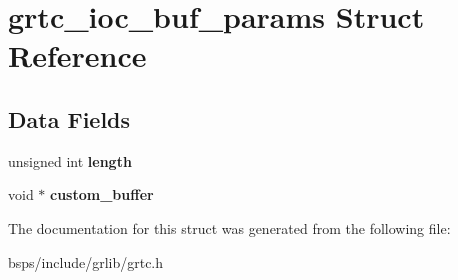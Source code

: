 \hypertarget{structgrtc__ioc__buf__params}{}\section{grtc\+\_\+ioc\+\_\+buf\+\_\+params Struct Reference}
\label{structgrtc__ioc__buf__params}
\subsection*{Data Fields}
\begin{DoxyCompactItemize}
\item 
\mbox{\label{structgrtc__ioc__buf__params_a294e1e148fd4b2de8901022903111938}} 
unsigned int {\bfseries length}
\item 
\mbox{\label{structgrtc__ioc__buf__params_aa986d4f50dc01eadb872a2505af16e5e}} 
void $\ast$ {\bfseries custom\+\_\+buffer}
\end{DoxyCompactItemize}


The documentation for this struct was generated from the following file\+:\begin{DoxyCompactItemize}
\item 
bsps/include/grlib/grtc.\+h\end{DoxyCompactItemize}
